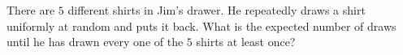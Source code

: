 There are $5$ different shirts in Jim's drawer. He repeatedly draws a shirt uniformly at random and puts it back. What is the expected number of draws until he has drawn every one of the $5$ shirts at least once?
